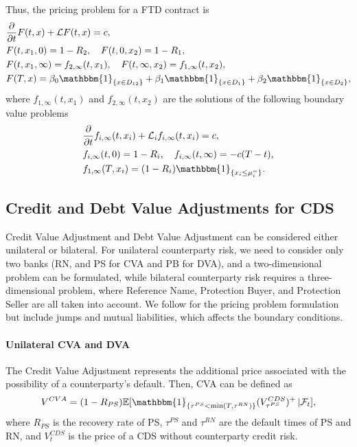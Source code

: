 Thus, the pricing problem for a FTD contract is
\begin{equation}
\begin{aligned}
		& \frac{\partial}{\partial t} F(t, x) + \mathcal{L} F(t, x) = c, \\
		& F(t, x_1, 0) = 1 - R_2,  \quad F(t, 0, x_2) = 1 - R_1, \\
		& F(t, x_1, \infty) = f_{2,\infty}(t, x_1), \quad F(t, \infty, x_2) = f_{1,\infty}(t, x_2), \\
		& F(T, x) = \beta_0  \mathbbm{1}_{\{x \in D_{12}\}} + \beta_1 \mathbbm{1}_{\{x \in D_{1}\}} + \beta_2 \mathbbm{1}_{\{x \in D_{2}\}},
\end{aligned}
\end{equation}
where $f_{1,\infty}(t, x_1)$ and $f_{2,\infty}(t, x_2)$ are the solutions of the following boundary value problems
\begin{equation}
\begin{aligned}
		& \frac{\partial}{\partial t} f_{i, \infty}(t, x_i) + \mathcal{L}_i f_{i, \infty}(t, x_i) = c, \\
		& f_{i, \infty}(t, 0) = 1 - R_i, \quad f_{i, \infty}(t, \infty) = -c(T-t), \\
		& f_{1, \infty}(T, x_i) = (1 - R_i) \mathbbm{1}_{\{x_i \le \mu_i^{=}\}}.
\end{aligned}
\end{equation}

\subsection{Credit and Debt Value Adjustments for CDS}

Credit Value Adjustment and Debt Value Adjustment can be considered either unilateral or bilateral. For unilateral counterparty risk, we need to consider only two banks (RN, and PS for CVA and PB for DVA), and a two-dimensional problem can be formulated, while bilateral counterparty risk requires a three-dimensional problem, where Reference Name, Protection Buyer, and Protection Seller are all taken into account. We follow \cite{LiptonSav} for the pricing problem formulation but include jumps and mutual liabilities, which affects the boundary conditions.

\paragraph{Unilateral CVA and DVA}
The Credit Value Adjustment represents the additional price associated with the possibility of a counterparty's default. Then, CVA can be defined as
\begin{equation}
	V^{CVA} = (1- R_{PS}) \mathbb{E}[\mathbbm{1}_{\{\tau^{PS} < \min(T, \tau^{RN}) \}} (V_{\tau^{PS}}^{CDS})^{+} \, | \mathcal{F}_t],
\end{equation}
where $R_{PS}$ is the recovery rate of PS, $\tau^{PS}$ and $\tau^{RN}$ are the default times of PS and RN, and $V_t^{CDS}$ is the price of a CDS without counterparty credit risk.

